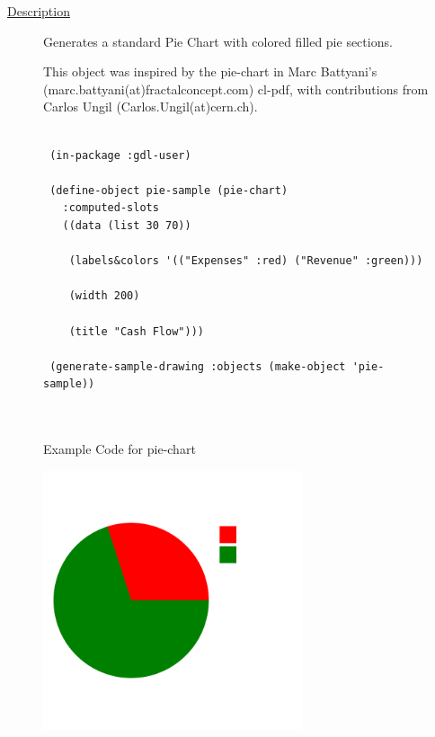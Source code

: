 \documentclass [11pt]{book}
\begin{document}
\begin{itemize}
\begin{description}

\item [
\underline{Description}]


Generates a standard Pie Chart with colored filled pie sections.

This object was inspired by the pie-chart in Marc Battyani's (marc.battyani(at)fractalconcept.com)
cl-pdf, with contributions from Carlos Ungil (Carlos.Ungil(at)cern.ch).



\end{description}




\begin{figure}
\begin{lrbox}{\boxedverb}
\begin{minipage}{\linewidth}
{\small

\begin{verbatim}

 (in-package :gdl-user)
 
 (define-object pie-sample (pie-chart)
   :computed-slots
   ((data (list 30 70))
   
    (labels&colors '(("Expenses" :red) ("Revenue" :green)))
   
    (width 200) 
   
    (title "Cash Flow")))

 (generate-sample-drawing :objects (make-object 'pie-sample))

 
\end{verbatim}}
\end{minipage}
\end{lrbox}
\fbox{\usebox{\boxedverb}}

\caption{Example Code for pie-chart}

\label{fig:example-code-pie-chart}

\end{figure}

\begin{figure}
\begin{center}
\includegraphics[width=3in,height=3in]{../images/example-pie-chart.pdf}
\end{center}


\end{figure}
\end{itemize}
\end{document}
